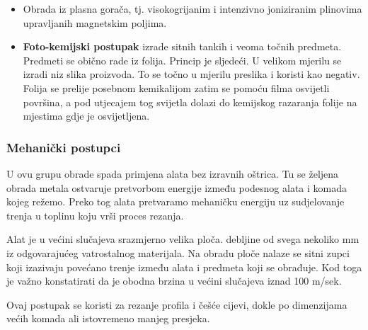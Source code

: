 \documentclass[a4paper,12pt]{article}
\numberwithin{figure}{section}
\begin{document}
\begin{enumerate}
\begin{itemize}
\item Obrada iz plasna gorača, tj. visokogrijanim i intenzivno joniziranim plinovima upravljanih magnetskim poljima.
\item \textbf{Foto-kemijski postupak} izrade sitnih tankih i veoma točnih predmeta. Predmeti se obično rade iz folija. Princip je sljedeći. U velikom mjerilu se izradi niz slika proizvoda. To se točno u mjerilu preslika i koristi kao negativ. Folija se prelije posebnom kemikalijom zatim se pomoću filma osvijetli površina, a pod utjecajem tog svijetla dolazi do kemijskog razaranja folije na mjestima gdje je osvijetljena.
\end{itemize}
\end{enumerate}
\subsubsection{Mehanički postupci}
U ovu grupu obrade spada primjena alata bez izravnih oštrica. Tu se željena obrada metala ostvaruje pretvorbom energije između podesnog alata i komada kojeg režemo. Preko tog alata pretvaramo mehaničku energiju uz sudjelovanje trenja u toplinu koju vrši proces rezanja.\par
Alat je u većini slučajeva srazmjerno velika ploča. debljine od svega nekoliko mm iz odgovarajućeg vatrostalnog materijala. Na obradu ploče nalaze se sitni zupci koji izazivaju povećano trenje između alata i predmeta koji se obrađuje. Kod toga je važno konstatirati da je obodna brzina u većini slučajeva iznad 100 m/sek. \par
Ovaj postupak se koristi za rezanje profila i češće cijevi, dokle po dimenzijama većih komada ali istovremeno manjeg presjeka.
\end{document}
